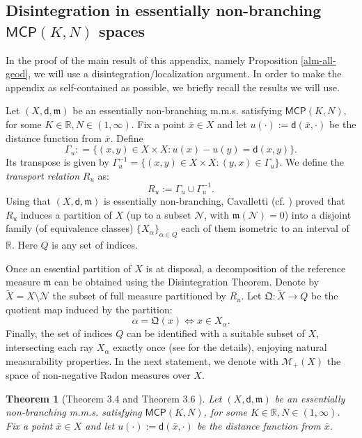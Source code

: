 \documentclass[a4paper]{amsart}
\theoremstyle{plain}
\newtheorem{theorem}[lemma]{Theorem}
\theoremstyle{definition}
\numberwithin{equation}{section}
\newcommand{\R}{\mathbb{R}}
\newcommand{\MCP}{\mathsf{MCP}}
\newcommand{\mm}{\mathfrak m}
\newcommand{\QQ}{\mathfrak Q}
\newcommand{\sfd}{\mathsf d}
\begin{document}
{{\subsection{Disintegration in essentially non-branching $\MCP(K,N)$ spaces}
In the proof of the main result of this appendix, namely Proposition \ref{alm-all-geod}, we will use a disintegration/localization argument. In order to make the appendix as self-contained as possible, we briefly recall the results we will use.

Let $(X,\sfd,\mm)$ be an essentially non-branching m.m.s. satisfying $\MCP(K,N)$, for some $K\in \R, N\in (1,\infty)$. 
Fix a point $\bar{x}\in X$ and let $u(\cdot):=\sfd(\bar{x}, \cdot)$ be the distance function from $\bar{x}$.
Define
\begin{equation}\label{E:Gamma}  
\Gamma_{u} : = \{ (x,y) \in X\times X : u(x) - u(y) = \sfd(x,y) \}.
\end{equation}
%
Its transpose is given by $\Gamma^{-1}_{u}= \{ (x,y) \in X \times X : (y,x) \in \Gamma_{u} \}$. We define the \emph{transport relation} $R_u$  as:
%
\begin{equation}\label{E:R}
R_{u} := \Gamma_{u} \cup \Gamma^{-1}_{u}.
\end{equation}
%
Using that $(X,\sfd,\mm)$ is essentially non-branching, Cavalletti \cite{cava:MongeRCD}  (cf. \cite{biacava:streconv}) proved that $R_{u}$  induces a partition of $X$ (up to a subset $\mathcal N$, with   $\mm(\mathcal N)=0$) into a disjoint family (of equivalence classes) $\{X_{\alpha}\}_{\alpha \in Q}$ each of them isometric to an interval of $\R$. Here $Q$ is any set of indices.

Once an essential partition of $X$ is at disposal, a decomposition of the reference measure $\mm$ can be obtained using the Disintegration Theorem. Denote by $\tilde{X}=X\setminus \mathcal N$ the subset of full measure partitioned by $R_{u}$.  Let  $\QQ : \tilde{X} \to Q$ be the quotient map induced by the partition:
%
\begin{equation}\label{E:defineQ}
\alpha = \QQ(x) \iff x \in X_{\alpha}.
\end{equation}
%
Finally, the set of indices $Q$ can be identified with a suitable subset of $X$, intersecting each ray $X_{\alpha}$ exactly once (see \cite[Section 3.1]{CaMo} for the details), enjoying natural measurability properties.
In the next statement, we denote with  $\mathcal{M}_{+}(X)$ the space of non-negative Radon measures over $X$. 

\begin{theorem}[Theorem 3.4 and Theorem 3.6 \cite{CaMo}]\label{thm:DisintMCP}
Let $(X,\sfd,\mm)$ be an essentially non-branching m.m.s. satisfying $\MCP(K,N)$, for some $K\in \R, N\in (1,\infty)$. 
Fix a point $\bar{x}\in X$ and let $u(\cdot):=\sfd(\bar{x}, \cdot)$ be the distance function from $\bar{x}$.


\end{theorem}}}
\end{document}
